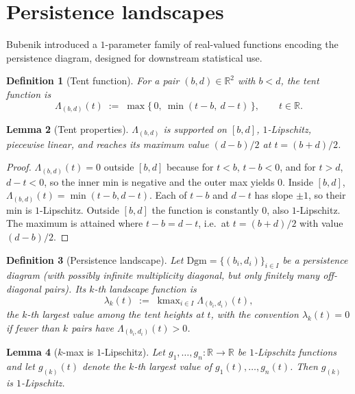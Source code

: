 \documentclass[11pt]{article}
\theoremstyle{persdef}
\newtheorem{definition}{Definition}[section]
\newtheorem{lemma}[definition]{Lemma}
\newcommand{\R}{\mathbb{R}}
\newcommand{\PD}{\mathrm{Dgm}}
\newcommand{\Land}{\lambda}
\begin{document}
\section{Persistence landscapes}

Bubenik \cite{Bub15} introduced a $1$-parameter family of real-valued functions encoding the persistence diagram, designed for downstream statistical use.

\begin{definition}[Tent function]\label{def:tent}
For a pair $(b,d)\in\R^2$ with $b<d$, the \emph{tent function} is
\[
\Lambda_{(b,d)}(t) \;:=\; \max\bigl\{\,0,\ \min(t-b,\ d-t)\,\bigr\}, \qquad t\in\R.
\]
\end{definition}

\begin{lemma}[Tent properties]\label{lem:tent}
$\Lambda_{(b,d)}$ is supported on $[b,d]$, $1$-Lipschitz, piecewise linear, and reaches its maximum value $(d-b)/2$ at $t=(b+d)/2$.
\end{lemma}

\begin{proof}
$\Lambda_{(b,d)}(t)=0$ outside $[b,d]$ because for $t<b$, $t-b<0$, and for $t>d$, $d-t<0$, so the inner min is negative and the outer max yields $0$. Inside $[b,d]$, $\Lambda_{(b,d)}(t)=\min(t-b,d-t)$. Each of $t-b$ and $d-t$ has slope $\pm 1$, so their min is $1$-Lipschitz. Outside $[b,d]$ the function is constantly $0$, also $1$-Lipschitz. The maximum is attained where $t-b=d-t$, i.e.\ at $t=(b+d)/2$ with value $(d-b)/2$.
\end{proof}

\begin{definition}[Persistence landscape]\label{def:landscape}
Let $\PD = \{(b_i,d_i)\}_{i\in I}$ be a persistence diagram (with possibly infinite multiplicity diagonal, but only finitely many off-diagonal pairs). Its \emph{$k$-th landscape function} is
\[
\Land_k(t) \;:=\; \operatorname{kmax}_{i\in I} \Lambda_{(b_i,d_i)}(t),
\]
the $k$-th largest value among the tent heights at $t$, with the convention $\Land_k(t)=0$ if fewer than $k$ pairs have $\Lambda_{(b_i,d_i)}(t)>0$.
\end{definition}

\begin{lemma}[$k$-max is $1$-Lipschitz]\label{lem:kmaxlip}
Let $g_1,\dots,g_n:\R\to\R$ be $1$-Lipschitz functions and let $g_{(k)}(t)$ denote the $k$-th largest value of $g_1(t),\dots,g_n(t)$. Then $g_{(k)}$ is $1$-Lipschitz.
\end{lemma}
\end{document}

